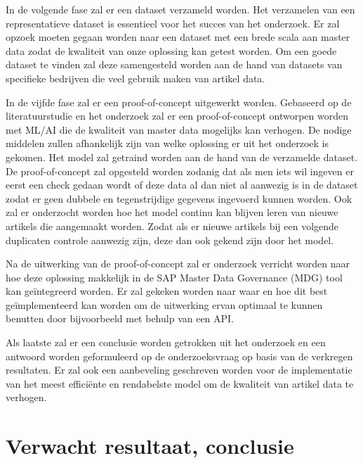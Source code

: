 In de volgende fase zal er een dataset verzameld worden. Het verzamelen van een representatieve dataset is essentieel voor het succes van het onderzoek. Er zal opzoek moeten gegaan worden naar een dataset met een brede scala aan master data zodat de kwaliteit van onze oplossing kan getest worden. Om een goede dataset te vinden zal deze samengesteld worden aan de hand van datasets van specifieke bedrijven die veel gebruik maken van artikel data.

In de vijfde fase zal er een proof-of-concept uitgewerkt worden. Gebaseerd op de literatuurstudie en het onderzoek zal er een proof-of-concept ontworpen worden met ML/AI die de kwaliteit van master data mogelijks kan verhogen. De nodige middelen zullen afhankelijk zijn van welke oplossing er uit het onderzoek is gekomen. Het model zal getraind worden aan de hand van de verzamelde dataset. De proof-of-concept zal opgesteld worden zodanig dat als men iets wil ingeven er eerst een check gedaan wordt of deze data al dan niet al aanwezig is in de dataset zodat er geen dubbele en tegenstrijdige gegevens ingevoerd kunnen worden. Ook zal er onderzocht worden hoe het model continu kan blijven leren van nieuwe artikels die aangemaakt worden. Zodat als er nieuwe artikels bij een volgende duplicaten controle aanwezig zijn, deze dan ook gekend zijn door het model.

Na de uitwerking van de proof-of-concept zal er onderzoek verricht worden naar hoe deze oplossing makkelijk in de SAP Master Data Governance (MDG) tool kan geïntegreerd worden. Er zal gekeken worden naar waar en hoe dit best geïmplementeerd kan worden om de uitwerking ervan optimaal te kunnen benutten door bijvoorbeeld met behulp van een API.

Als laatste zal er een conclusie worden getrokken uit het onderzoek en een antwoord worden geformuleerd op de onderzoeksvraag op basis van de verkregen resultaten. Er zal ook een aanbeveling geschreven worden voor de implementatie van het meest efficiënte en rendabelste model om de kwaliteit van artikel data te verhogen.

\begin{center}
\end{center}

\section{Verwacht resultaat, conclusie}%
\label{sec:verwachte_resultaten}

